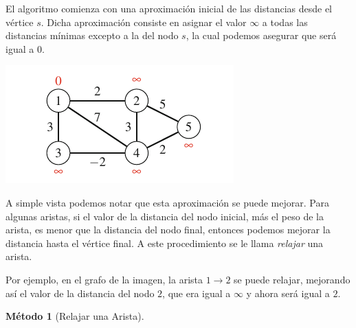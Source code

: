 \documentclass[a4paper, 10pt]{article}
\numberwithin{theoremCounter}{subsection}
\numberwithin{problemCounter}{subsection}
\numberwithin{defCounter}{subsection}
\numberwithin{obsCounter}{subsection}
\newcounter{methCounter}
\numberwithin{methCounter}{subsection}
\numberwithin{exampleCounter}{subsection}
\numberwithin{propCounter}{subsection}
\theoremstyle{violetnumbox}
\theoremstyle{blacknumex}
\newtheorem{corollaryT}[methCounter]{M\'etodo}
\newenvironment{corollary}{\begin{cBox}\begin{corollaryT}}{\end{corollaryT}\end{cBox}}
\begin{document}
\begin{multicols}{2}
    El algoritmo comienza con una aproximaci\'on inicial de las distancias desde el v\'ertice $s$. Dicha aproximaci\'on consiste en asignar el valor $\infty$ a todas las distancias m\'inimas excepto a la del nodo $s$, la cual podemos asegurar que ser\'a igual a $0$.

    \begin{minipage}{\columnwidth}
        \includegraphics[width=\linewidth]{imag/graph1}
        \label{example_sum}
    \end{minipage}

    A simple vista podemos notar que esta aproximaci\'on se puede mejorar. Para algunas aristas, si el valor de la distancia del nodo inicial, m\'as el peso de la arista, es menor que la distancia del nodo final, entonces podemos mejorar la distancia hasta el v\'ertice final. A este procedimiento se le llama \textit{relajar} una arista.

    Por ejemplo, en el grafo de la imagen, la arista $1 \rightarrow 2$ se puede relajar, mejorando as\'i el valor de la distancia del nodo $2$, que era igual a $\infty$ y ahora ser\'a igual a $2$.

    \begin{corollary}[Relajar una Arista]

    \end{corollary}



\end{multicols}
\end{document}

